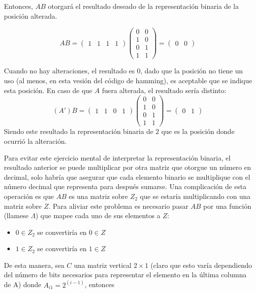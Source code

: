 \documentclass{article}
\begin{document}
Entonces, $AB$ otorgará el resultado deseado de la representación binaria de la posición alterada.

$$
AB = \begin{pmatrix}
    1 & 1 & 1 & 1
\end{pmatrix} 
\begin{pmatrix}
    0 & 0 \\
    1 & 0 \\
    0 & 1 \\
    1 & 1
\end{pmatrix}
= \begin{pmatrix}
    0 & 0
\end{pmatrix}
$$

Cuando no hay alteraciones, el resultado es $0$, dado que la posición no tiene un uso (al menos, en esta vesión del código de hamming), es aceptable que se indique esta posición. En caso de que $A$ fuera alterada, el resultado sería distinto:
$$
(A')B = \begin{pmatrix}
    1 & 1 & 0 & 1
\end{pmatrix} 
\begin{pmatrix}
    0 & 0 \\
    1 & 0 \\
    0 & 1 \\
    1 & 1
\end{pmatrix}
= \begin{pmatrix}
    0 & 1
\end{pmatrix}
$$
Siendo este resultado la representación binaria de $2$ que es la posición donde ocurrió la alteración.

Para evitar este ejercicio mental de interpretar la representación binaria, el resultado anterior se puede multiplicar por otra matriz que otorgue un número en decimal, solo habría que asegurar que cada elemento binario se multiplique con el número decimal que representa para después sumarse. Una complicación de esta operación es que $AB$ es una matriz sobre $Z_2$ que se estaría multiplicando con una matriz sobre $Z$. Para aliviar este problema es necesario pasar $AB$ por una función (llamese $\Lambda$) que mapee cada uno de sus elementos a $Z$:
\begin{itemize}
    \item $0 \in Z_2$ se convertiría en $0 \in Z$
    \item $1 \in Z_2$ se convertiría en $1 \in Z$
\end{itemize}

De esta manera, sea $C$ una matriz vertical $2 \times 1$ (claro que esto varía dependiendo del número de bits necesarios para representar el elemento en la última columna de A) donde $A_{i1} = 2^(i-1)$, entonces
\end{document}

